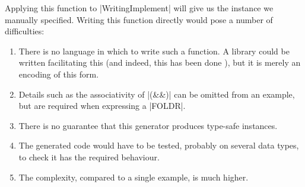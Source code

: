 \documentclass{llncs}
\begin{document}
Applying this function to |WritingImplement| will give us the instance we manually specified. Writing this function directly would pose a number of difficulties:

\begin{enumerate}
\item There is no language in which to write such a function. A library could be written facilitating this (and indeed, this has been done \cite{drift}), but it is merely an encoding of this form.
\item Details such as the associativity of |(&&)| can be omitted from an example, but are required when expressing a |FOLDR|.
\item There is no guarantee that this generator produces type-safe instances.
\item The generated code would have to be tested, probably on several data types, to check it has the required behaviour.
\item The complexity, compared to a single example, is much higher.
\end{enumerate}
\end{document}
